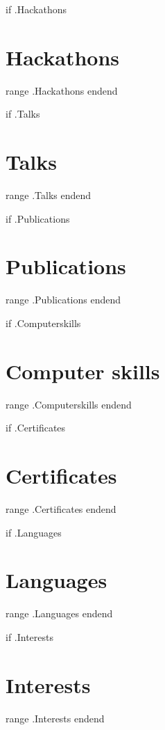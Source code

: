 \documentclass[10pt,a4paper,sans]{moderncv}
\begin{document}
{{if .Hackathons}}\section{Hackathons}
{{range .Hackathons}}
{{end}}{{end}}

{{if .Talks}}\section{Talks}
{{range .Talks}}
{{end}}{{end}}

{{if .Publications}}\section{Publications}
{{range .Publications}}
{{end}}{{end}}

{{if .Computerskills}}\section{Computer skills}
{{range .Computerskills}}
{{end}}{{end}}

{{if .Certificates }}\section{Certificates}
{{range .Certificates }}
{{end}}{{end}}

{{if .Languages}}\section{Languages}
{{range .Languages}}
{{end}}{{end}}

{{if .Interests}}\section{Interests}
{{range .Interests}}
{{end}}{{end}}
\end{document}
